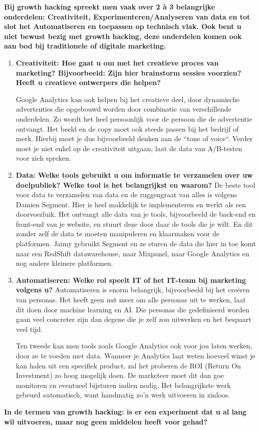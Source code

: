 \textbf{Bij growth hacking spreekt men vaak over 2 à 3 belangrijke onderdelen: Creativiteit, Experimenteren/Analyseren van data en tot slot het Automatiseren en toepassen op technisch vlak. Ook bent u niet bewust bezig met growth hacking, deze onderdelen komen ook aan bod bij traditionele of digitale marketing.}
\begin{enumerate}[label*=\arabic*.]
	\item \textbf{Creativiteit: Hoe gaat u om met het creatieve proces van marketing? Bijvoorbeeld: Zijn hier brainstorm sessies voorzien? Heeft u creatieve ontwerpers die helpen?}
	
	Google Analytics kan ook helpen bij het creatieve deel, door dynamische advertenties die opgebouwd worden door combinatie van verschillende onderdelen. Zo wordt het heel persoonlijk voor de persoon die de advertentie ontvangt. Het beeld en de copy moet ook steeds passen bij het bedrijf of merk. Hierbij moet je dus bijvoorbeeld denken aan de ``tone of voice``. Verder moet je niet enkel op de creativiteit uitgaan, laat de data van A/B-testen voor zich spreken.
	
	\item \textbf{Data: Welke tools gebruikt u om informatie te verzamelen over uw doelpubliek? Welke tool is het belangrijkst en waarom?}
	De beste tool voor data te verzamelen van data en de ruggengraat van alles is volgens Damien Segment. Hier is heel makkelijk te implementeren en werkt als een doorvoerluik. Het ontvangt alle data van je tools, bijvoorbeeld de back-end en front-end van je website, en stuurt deze door daar de tools die je wilt. En dit zonder zelf de data te moeten manipuleren en klaarmaken voor de platformen. Jaimy gebruikt Segment en ze sturen de data die hier in toe komt naar een RedShift datawarehouse, naar Mixpanel, naar Google Analytics en nog andere kleinere platformen.	
	
	\item \textbf{Automatiseren: Welke rol speelt IT of het IT-team bij marketing volgens u? }
	Automatiseren is enorm belangrijk, bijvoorbeeld bij het creëren van personas. Het heeft geen nut meer om alle personas uit te werken, laat dit doen door machine learning en AI. Die personas die gedefinieerd worden gaan veel concreter zijn dan degene die je zelf zou uitwerken en het bespaart veel tijd.
	
	Ten tweede kan men tools zoals Google Analytics ook voor jou laten werken, door ze te voeden met data. Wanneer je Analytics laat weten hoeveel winst je kan halen uit een specifiek product, zal het proberen de ROI (Return On Investment) zo hoog mogelijk doen. De marketeer moet dit dan goe monitoren en eventueel bijsturen indien nodig. Het belangrijkste werk gebeurd automatisch, want handmatig zo'n werk uitvoeren in zinloos.
\end{enumerate}
\textbf{In de termen van growth hacking: is er een experiment dat u al lang wil uitvoeren, maar nog geen middelen heeft voor gehad?}
	
